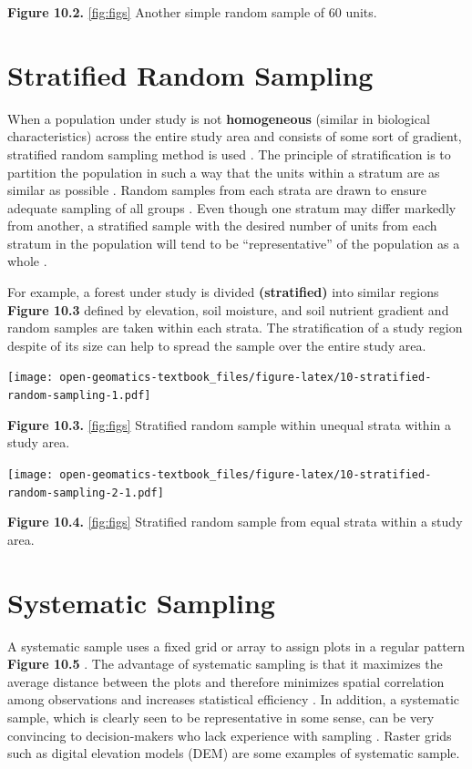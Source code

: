 \documentclass[
]{book}
\begin{document}
\textbf{Figure 10.2.} \ref{fig:figs} Another simple random sample of 60 units.

\hypertarget{stratified-random-sampling}{%
\section{Stratified Random Sampling}\label{stratified-random-sampling}}

When a population under study is not \textbf{homogeneous} (similar in biological characteristics) across the entire study area and consists of some sort of gradient, stratified random sampling method is used \citep{thompson2012sampling}. The principle of stratification is to partition the population in such a way that the units within a stratum are as similar as possible \citep{Teddlie2007}. Random samples from each strata are drawn to ensure adequate sampling of all groups \citep{Teddlie2007}. Even though one stratum may differ markedly from another, a stratified sample with the desired number of units from each stratum in the population will tend to be ``representative'' of the population as a whole \citep{Howell2020}.

For example, a forest under study is divided \textbf{(stratified)} into similar regions \textbf{Figure 10.3} defined by elevation, soil moisture, and soil nutrient gradient and random samples are taken within each strata. The stratification of a study region despite of its size can help to spread the sample over the entire study area.

\texttt{[image: open-geomatics-textbook\_files/figure-latex/10-stratified-random-sampling-1.pdf]}

\textbf{Figure 10.3.} \ref{fig:figs} Stratified random sample within unequal strata within a study area.

\texttt{[image: open-geomatics-textbook\_files/figure-latex/10-stratified-random-sampling-2-1.pdf]}

\textbf{Figure 10.4.} \ref{fig:figs} Stratified random sample from equal strata within a study area.

\hypertarget{systematic-sampling}{%
\section{Systematic Sampling}\label{systematic-sampling}}

A systematic sample uses a fixed grid or array to assign plots in a regular pattern \textbf{Figure 10.5} \citep{McRoberts2014}. The advantage of systematic sampling is that it maximizes the average distance between the plots and therefore minimizes spatial correlation among observations and increases statistical efficiency \citep{McRoberts2014}. In addition, a systematic sample, which is clearly seen to be representative in some sense, can be very convincing to decision-makers who lack experience with sampling \citep{McRoberts2014}. Raster grids such as digital elevation models (DEM) are some examples of systematic sample.
\end{document}
